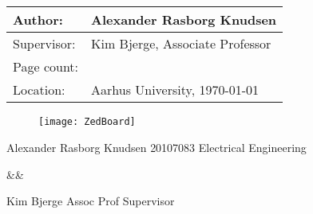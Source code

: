 
\begin{titlingpage}
	\begin{center}
		
		\textsc{\Large \ProjectType}\\[0.25cm]
		
		
		\HRule \\[0.4cm]
		{ \huge \bfseries \ProjectName}\\[0.4cm]
		
		\HRule \\[0.5cm]
		
		\begin{tabular}{p{} | p{}}
			\hline 
			Author: & Alexander Rasborg Knudsen\\ 
			\hline
			Supervisor: & Kim Bjerge, Associate Professor\\
			\hline 
			Page count: & \pageref{LastPage} \\
			\hline 
			Location: & Aarhus University, \today \\
			\hline
		\end{tabular} 
		\begin{figure}[hbtp]
			\centering
			\texttt{[image: ZedBoard]}
			\label{fig:frontpage}
		\end{figure}
	\end{center}
	
	
	\begin{Authors}
		
		\AT
		{Alexander Rasborg Knudsen}
		{20107083}
		{Electrical Engineering}
		
		&& %

		\AT
		{Kim Bjerge}
		{Assoc Prof}
		{Supervisor}

		
	\end{Authors}
	
	
\end{titlingpage}




